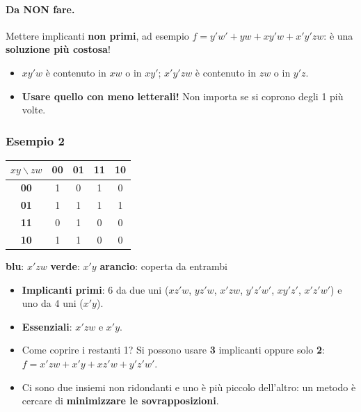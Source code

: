 \documentclass[12pt, a4paper]{article}
\begin{document}
\paragraph{Da NON fare.} Mettere implicanti \textcolor{red!80!black}{\textbf{non primi}}, ad esempio $f = y'w' + yw + xy'w + x'y'zw$: è una \textbf{soluzione più costosa}!
\begin{itemize}
    \item $xy'w$ è contenuto in $xw$ o in $xy'$; $x'y'zw$ è contenuto in $zw$ o in $y'z$.
    \item \textbf{Usare quello con meno letterali!} Non importa se si coprono degli 1 più volte.
\end{itemize}

\subsubsection{Esempio 2}
\begin{center}
\renewcommand{\arraystretch}{1.25}
\begin{tabular}[t]{|c|c|c|c|c|}
\hline
\colorbox{gray!25}{\color{black}$xy\backslash zw$} & \colorbox{gray!25}{\color{black}\textbf{00}} & \colorbox{gray!25}{\color{black}\textbf{01}} & \colorbox{gray!25}{\color{black}\textbf{11}} & \colorbox{gray!25}{\color{black}\textbf{10}} \\ \hline
\colorbox{gray!25}{\color{black}\textbf{00}} & 1 & 0 & \colorbox{blue!25}{\color{black}1} & 0 \\ \hline
\colorbox{gray!25}{\color{black}\textbf{01}} & \colorbox{green!30}{\color{black}1} & \colorbox{green!30}{\color{black}1} & \colorbox{orange!55}{\color{black}1} & \colorbox{green!30}{\color{black}1} \\ \hline
\colorbox{gray!25}{\color{black}\textbf{11}} & 0 & 1 & 0 & 0 \\ \hline
\colorbox{gray!25}{\color{black}\textbf{10}} & 1 & 1 & 0 & 0 \\ \hline
\end{tabular}
\end{center}
\begin{center}
\textcolor{blue!70!black}{\textbf{blu}}: $x'zw$ \qquad \textcolor{green!50!black}{\textbf{verde}}: $x'y$ \qquad \textcolor{orange!90!black}{\textbf{arancio}}: coperta da entrambi
\end{center}
\begin{itemize}
    \item \textbf{Implicanti primi}: 6 da due uni ($xz'w$, $yz'w$, $x'zw$, $y'z'w'$, $xy'z'$, $x'z'w'$) e uno da 4 uni ($x'y$).
    \item \textbf{Essenziali}: $x'zw$ e $x'y$.
    \item Come coprire i restanti 1? Si possono usare \textbf{3} implicanti oppure solo \textbf{2}: $f = x'zw + x'y + xz'w + y'z'w'$.
    \item Ci sono due insiemi non ridondanti e uno è più piccolo dell'altro: un metodo è cercare di \textbf{minimizzare le sovrapposizioni}.
\end{itemize}
\end{document}

